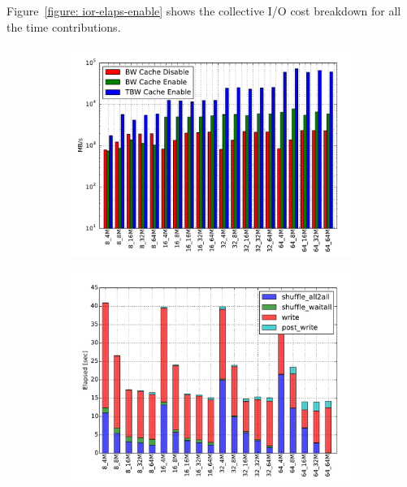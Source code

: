 Figure~\ref{figure: ior-elaps-enable} shows the collective I/O cost breakdown for all the time contributions. 
\begin{figure}[!htb]
  \begin{subfigure}[t]{0.51\textwidth}
  \centering
  \includegraphics[width=\textwidth]{chapters/chapter3/figures/ior_32GB_30sec_bw}
  \caption{}
  \label{figure: ior-bw}
  \end{subfigure}
  \begin{subfigure}[t]{0.51\textwidth}
  \centering
  \includegraphics[width=\textwidth]{chapters/chapter3/figures/ior_32GB_30sec_disable}
  \caption{}
  \label{figure: ior-elaps-disable}
  \end{subfigure}
  \begin{subfigure}[b]{\textwidth}

\end{subfigure}
\end{figure}
